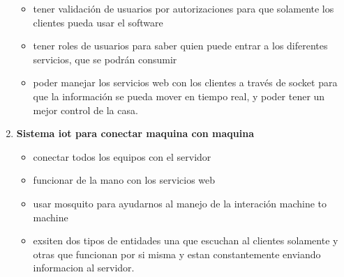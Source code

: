 \begin{enumerate}
\begin{itemize}
\item tener validación de usuarios por autorizaciones para que solamente los clientes pueda usar el software
\item tener roles de usuarios para saber quien puede entrar a los diferentes servicios, que se podrán consumir
\item poder manejar los servicios web con los clientes a través de socket para que la información se pueda mover en tiempo real, y poder tener un mejor control de la casa.
\end{itemize}
\item \textbf{Sistema iot para conectar maquina con maquina}
\begin{itemize}
\item conectar todos los equipos con el servidor
\item funcionar de la mano con los servicios web
\item usar mosquito para ayudarnos al manejo de la interación machine to machine
\item exsiten dos tipos de entidades una que escuchan al clientes solamente y otras que funcionan por si misma y estan constantemente enviando informacion al servidor.
\end{itemize}
\end{enumerate}